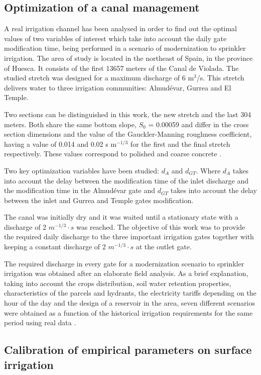 \documentclass[review,authoryear]{elsarticle}
\begin{document}
\subsection{Optimization of a canal management}

A real irrigation channel has been analysed in order to find out the optimal
values of two variables of interest which take into account the daily gate
modification time, being performed in a scenario of modernization to sprinkler
irrigation. The area of study is located in the northeast of Spain, in the
province of Huesca. It consists of the first 13657 meters of the Canal de
Violada. The studied stretch was designed for a maximum discharge of 6 m$^3$/s.
This stretch delivers water to three irrigation communities: Almudévar, Gurrea
and El Temple. 

Two sections can be distinguished in this work, the new stretch and the last 304
meters. Both share the same bottom slope, $S_0$ = 0.00059 and differ in the
cross section dimensions and the value of the Gauckler-Manning  roughness
coefficient, having a value of 0.014 and 0.02 s m$^{-1/3}$ for the first
and the final stretch respectively. These values correspond to polished and
coarse concrete \citep{Chow59}.

Two key optimization variables have been studied: $d_A$ and $d_{GT}$. Where
$d_A$ takes into account the delay between  the modification time of the inlet
discharge and the modification time in the Almudévar gate and $d_{GT}$ takes
into account the delay between the inlet and Gurrea and Temple gates
modification.

The canal was initially dry and it was waited until a stationary state with a discharge of 2 $m^{-1/3}\cdot s$ was reached. 
The objective of this work was to provide the required daily discharge to the three important irrigation gates together 
with keeping a constant discharge of 2 $m^{-1/3}\cdot s$ at the outlet gate. 

The required discharge in every gate for a modernization scenario to sprinkler irrigation was obtained after an elaborate 
field analysis. As a brief explanation, taking into account the crops distribution, soil water retention properties, 
characteristics of the parcels and hydrants, the electricity tariffs depending on the hour of the day and the design of a 
reservoir in the area, seven different scenarios were obtained as a function of the historical irrigation requirements for 
the same period using real data \citet{Zapata09}.

\subsection{Calibration of empirical parameters on surface irrigation}
\end{document}
